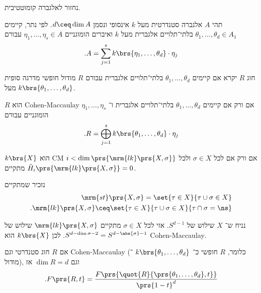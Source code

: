 \documentclass[10pt]{article}
\begin{document}
נחזור לאלגברה קומוטטיבית.

\begin{remark}
תהי
$A$
אלגברה סטנדרטית מעל
$k$
אינסופי ונסמן
$d \ceq \dim A$.
לפי נתר, קיימים
$\theta_1, \ldots, \theta_d \in A_1$
בלתי־תלויים אלגברית מעל
$k$
ואיברים הומוגניים
$\eta_1, \ldots, \eta_s \in A$
עבורם
\[\text{.} A = \sum_{j=1}^s k\brs{\eta_1, \ldots, \theta_d} \cdot \eta_j\]
\end{remark}

\begin{definition}
חוג
$R$
יקרא
אם קיימים
$\theta_1, \ldots, \theta_d$
בלתי־תלויים אלגברית עבורם
$R$
מודול חופשי מדרגה סופית מעל
$k\brs{\theta_1, \ldots, \theta_d}$.
\end{definition}

\begin{remark}
$R$
הוא
\textenglish{Cohen-Maccaulay}
אם ורק אם קיימים
$\theta_1, \ldots, \theta_d$
בלתי־תלויים אלגברית ו־%
$\eta_1, \ldots, \eta_s$
הומוגניים עבורם
\[\text{.} R = \bigoplus_{j=1}^s k\brs{\theta_1, \ldots, \theta_d} \cdot \eta_j\]
\end{remark}

\begin{theorem}
$k\brs{X}$
הוא
\textenglish{CM}
אם ורק אם לכל
$\sigma \in X$
ולכל
$i < \dim\prs{\mrm{lk}\prs{X,\sigma}}$
מתקיים
$\tilde{H}_i\prs{\mrm{lk}\prs{X,\sigma}} = 0$.
\end{theorem}

נזכיר שמתקיים
\begin{align*}
\mrm{st}\prs{X,\sigma} = \set{\tau \in X}{\tau \cup \sigma \in X} \\
\text{.} \mrm{lk}\prs{X,\sigma} \ceq \set{\tau \in X}{\tau \cup \sigma \in X}{ \tau \cap \sigma = \ns}
\end{align*}

\begin{remark}
נניח ש־%
$X$
שילוש של
$S^{d-1}$.
אזי לכל
$\sigma \in X$
מתקיים
$\mrm{lk}\prs{X,\sigma}$
שילוש של
$S^{d - \dim \sigma - 2} = S^{d - \abs{\sigma} - 1}$.
לכן
$k\brs{X}$
הוא
\textenglish{Cohen-Maccaulay}.
\end{remark}

\begin{proposition}
אם
$R$
חוג סטנדרטי וגם
\textenglish{Cohen-Maccaulay}
(כלומר,
$R$
חופשי כ־%
$k\brs{\theta_1, \ldots, \theta_d}$%
־מודול), וגם
$\dim R = d$
אז
\[\text{.} F\prs{R,t} = \frac{F\prs{\quot{R}{\prs{\theta_1, \ldots, \theta_d}, t}}}{\prs{1-t}^d}\]
\end{proposition}
\end{document}
